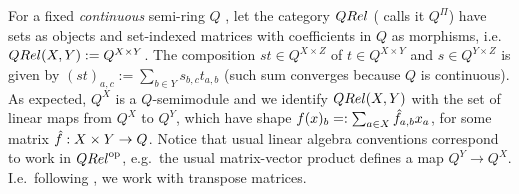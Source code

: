 
For a fixed \emph{continuous} semi-ring $Q$ \cite[Def. II.5]{Manzo2013}, let the category $\QREL$ (\cite{Manzo2013} calls it $Q^\Pi$) have sets as objects and set-indexed matrices with coefficients in $Q$ as morphisms, i.e.~$\QREL(X,Y):=Q^{X\times Y}$.
The composition $st\in Q^{X\times Z}$ of $t\in Q^{X\times Y}$ and $s\in Q^{Y\times Z}$ is given by $(st)_{a,c}:=\sum_{b\in Y} s_{b,c}t_{a,b}$ (such sum converges because $Q$ is continuous).
As expected, $Q^X$ is a $Q$-semimodule and we identify $\HOM{\QREL}{X}{Y}$ with the set of linear maps from $Q^X$ to $Q^Y$, which have shape $f(x)_b=:\sum_{a\in X} \hat{f}_{a,b}x_a$, for some matrix $\hat{f}:X\times Y\to Q$.
% 
Notice that usual linear algebra conventions correspond to work in $\QREL^{\op}$, %
e.g.\ the usual matrix-vector product defines a map $Q^Y\to Q^X$.
I.e.\ following \cite{Manzo2013, Hofmann2014, Ehrhard2005}, we work with transpose matrices.
%
%
%
%

